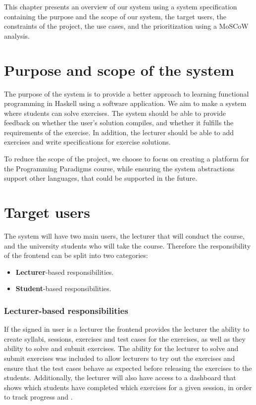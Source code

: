 This chapter presents an overview of our system using a system specification containing the purpose and the scope of our system, the target users, the constraints of the project, the use cases, and the prioritization using a MoSCoW analysis.

\section*{Purpose and scope of the system }
The purpose of the system is to provide a better approach to learning functional programming in Haskell using a software application.
We aim to make a system where students can solve exercises. The system should be able to provide feedback on whether the user's solution compiles, and whether it fulfills the requirements of the exercise. 
In addition, the lecturer should be able to add exercises and write specifications for exercise solutions.

To reduce the scope of the project, we choose to focus on creating a platform for the Programming Paradigms course, while ensuring the system abstractions support other languages, that could be supported in the future.

\section*{Target users}
The system will have two main users, the lecturer that will conduct the course, and the university students who will take the course.
Therefore the responsibility of the frontend can be split into two categories: 
\begin{itemize}
    \item \textbf{Lecturer}-based responsibilities.
    \item \textbf{Student}-based responsibilities.
\end{itemize}

\subsubsection*{Lecturer-based responsibilities}
If the signed in user is a lecturer the frontend provides the lecturer the ability to create syllabi, sessions, exercises and test cases for the exercises, as well as they ability to solve and submit exercises. The ability for the lecturer to solve and submit exercises was included to allow lecturers to try out the exercises and ensure that the test cases behave as expected before releasing the exercises to the students. Additionally, the lecturer will also have access to a dashboard that shows which students have completed which exercises for a given session, in order to track progress and .

